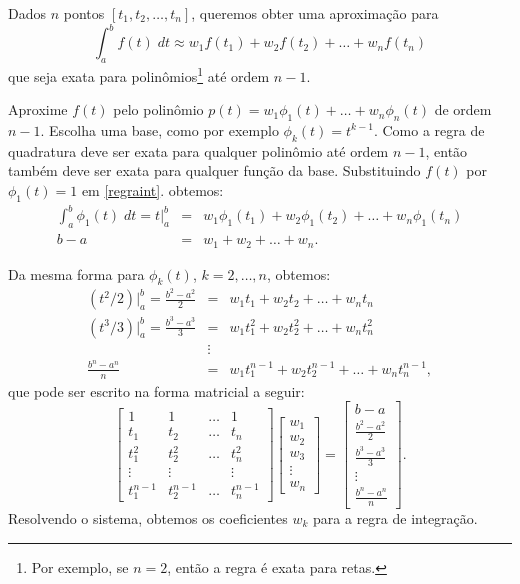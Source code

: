 Dados $n$ pontos $[t_1, t_2, \ldots,t_n]$, queremos obter uma aproximação para
\begin{equation}\label{regraint}
  \int _a^b f(t) \;dt \approx w_1f(t_1)+w_2f(t_2)+\ldots +w_nf(t_n)
\end{equation}
que seja exata para polinômios\footnote{Por exemplo, se $n=2$, então a regra é exata para retas.} até ordem  $n-1$.

Aproxime $f(t)$ pelo polinômio $p(t)=w_1\phi_1(t)+\ldots +w_n \phi_n(t)$ de ordem $n-1$. Escolha uma base, como por exemplo $\phi _k(t)=t^{k-1}$. Como a regra de quadratura deve ser exata para qualquer polinômio até ordem $n-1$, então também deve ser exata para qualquer função da base. Substituindo $f(t)$ por $\phi _1(t)=1$ em \eqref{regraint}. obtemos:
\begin{eqnarray}
\int _a^b \phi_1(t) \; dt = t|_a^b &=&  w_1\phi _1(t_1)+w_2\phi _1(t_2)+\ldots +w_n\phi_1(t_n) \\
                              b-a  &=&  w_1+w_2+\ldots +w_n.
\end{eqnarray}

Da mesma forma para $\phi_k(t)$, $k=2,\ldots,n$, obtemos:
\begin{eqnarray}
   (t^2/2)|_a^b = \frac{b^2-a^2}{2} &=&  w_1t_1  +w_2t_2  +\ldots +w_nt_n   \\
   (t^3/3)|_a^b = \frac{b^3-a^3}{3} &=&  w_1t_1^2+w_2t_2^2+\ldots +w_nt_n^2 \\
                              &\vdots&      \\
 \frac{b^{n}-a^{n}}{n}              &=&  w_1t_1^{n-1}+w_2t_2^{n-1}+\ldots +w_nt_n^{n-1},
\end{eqnarray}
que pode ser escrito na forma matricial a seguir:
\begin{equation}
\begin{bmatrix}
    1     &  1    & \ldots   &  1 \\
    t_1   &  t_2   & \ldots   & t_n \\
    t_1^2 &  t_2^2  & \ldots   & t_n^2 \\
    \vdots    &  \vdots     &    & \vdots   \\
    t_1^{n-1} & t_2^{n-1} & \ldots   & t_n^{n-1}
\end{bmatrix}
\begin{bmatrix}  w_1 \\ w_2\\ w_3  \\ \vdots   \\ w_n     \end{bmatrix}
=
\begin{bmatrix}  b-a  \\ \frac{b^2-a^2}{2} \\ \frac{b^3-a^3}{3} \\ \vdots  \\ \frac{b^{n}-a^{n}}{n}  \end{bmatrix}.
\end{equation}
Resolvendo o sistema, obtemos os coeficientes $w_k$ para a regra de integração.

